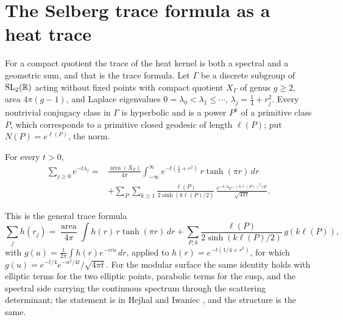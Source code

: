 \section{The Selberg trace formula as a heat trace}\label{sec:msstf}

For a compact quotient the trace of the heat kernel is both a spectral and a geometric sum, and that is the trace formula. Let $\Gamma$ be a discrete subgroup of $\mathrm{SL}_2(\mathbb{R})$ acting without fixed points with compact quotient $X_\Gamma$ of genus $g\ge2$, area $4\pi(g-1)$, and Laplace eigenvalues $0=\lambda_0<\lambda_1\le\cdots$, $\lambda_j=\frac14+r_j^2$. Every nontrivial conjugacy class in $\Gamma$ is hyperbolic and is a power $P^k$ of a primitive class $P$, which corresponds to a primitive closed geodesic of length $\ell(P)$; put $N(P)=e^{\ell(P)}$, the norm.

\begin{theorem}\label{thm:msstf}
For every $t>0$,
\begin{equation}\label{eq:msstf}
\begin{split}
\sum_{j\ge0}e^{-t\lambda_j}={}&\frac{\operatorname{area}(X_\Gamma)}{4\pi}\int_{-\infty}^\infty e^{-t(\frac14+r^2)}\,r\tanh(\pi r)\,dr\\
&+\sum_P\sum_{k\ge1}\frac{\ell(P)}{2\sinh(k\ell(P)/2)}\,\frac{e^{-t/4}e^{-(k\ell(P))^2/4t}}{\sqrt{4\pi t}} .
\end{split}
\end{equation}
\end{theorem}

This is the general trace formula
\[
\sum_jh(r_j)=\frac{\operatorname{area}}{4\pi}\int h(r)\,r\tanh(\pi r)\,dr+\sum_{P,k}\frac{\ell(P)}{2\sinh(k\ell(P)/2)}\,g(k\ell(P)),
\]
with $g(u)=\frac1{2\pi}\int h(r)e^{-iru}\,dr$, applied to $h(r)=e^{-t(1/4+r^2)}$, for which $g(u)=e^{-t/4}e^{-u^2/4t}/\sqrt{4\pi t}$. For the modular surface the same identity holds with elliptic terms for the two elliptic points, parabolic terms for the cusp, and the spectral side carrying the continuous spectrum through the scattering determinant; the statement is in Hejhal \cite{hejhal1983} and Iwaniec \cite{iwaniec2002}, and the structure is the same.

